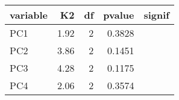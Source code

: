 
\begin{tabular}{lrrrl}
\toprule
variable & K2 & df & pvalue & signif\\
\midrule
PC1 & 1.92 & 2 & 0.3828 & \\
PC2 & 3.86 & 2 & 0.1451 & \\
PC3 & 4.28 & 2 & 0.1175 & \\
PC4 & 2.06 & 2 & 0.3574 & \\
\bottomrule
\end{tabular}
